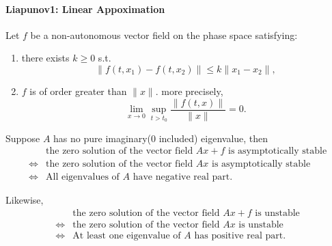 \documentclass{tufte-handout}
\newcommand\n[1]{\lVert#1\rVert}
\begin{document}
\paragraph{Liapunov1: Linear Appoximation}
\begin{theorem} 
Let $f$ be a non-autonomous vector field on the phase space satisfying:
\begin{enumerate}
	\item there exists $k\geq 0$ s.t. \[ \n{f(t,x_1)-f(t,x_2)} \leq k \n{x_1-x_2}, \]
	\item $f$ is of order greater than $\n{x}$. more precisely, \[ \lim_{x\to 0} \sup_{t>t_0} \frac{\n{f(t,x)}}{\n{x}}=0. \]
\end{enumerate}

Suppose $A$ has no pure imaginary(0 included) eigenvalue, then
\begin{align*}
& \text{the zero solution of the vector field } Ax+f \text{ is asymptotically stable}\\
\iff & \text{the zero solution of the vector field } Ax \text{ is asymptotically stable} \\
\iff & \text{All eigenvalues of } A \text{ have negative real part}.
\end{align*}

Likewise,
\begin{align*}
& \text{the zero solution of the vector field } Ax+f \text{ is unstable}\\
\iff & \text{the zero solution of the vector field } Ax \text{ is unstable} \\
\iff & \text{At least one eigenvalue of } A \text{ has positive real part}.
\end{align*}
 \end{theorem}
\end{document}
